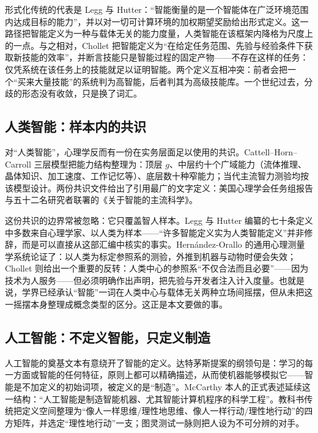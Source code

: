\documentclass[10pt,fontset=fandol]{ctexart}
\begin{document}
形式化传统的代表是 Legg 与 Hutter：“智能衡量的是一个智能体在广泛环境范围内达成目标的能力”\cite{legg2007universal}，并以对一切可计算环境的加权期望奖励给出形式定义。这一路径把智能定义为一种与载体无关的能力度量，人类智能在该框架内降格为尺度上的一点。与之相对，Chollet 把智能定义为“在给定任务范围、先验与经验条件下获取新技能的效率”\cite{chollet2019measure}，并断言技能只是智能过程的固定产物——不存在这样的任务：仅凭系统在该任务上的技能就足以证明智能。两个定义互相冲突：前者会把一个“买来大量技能”的系统判为高智能，后者判其为高级技能库。一个世纪过去，分歧的形态没有收敛，只是换了词汇。

\subsection{人类智能：样本内的共识}

对“人类智能”，心理学反而有一份在实务层面足以使用的共识。Cattell--Horn--Carroll 三层模型把能力结构整理为：顶层 $g$、中层约十个广域能力（流体推理、晶体知识、加工速度、工作记忆等）、底层数十种窄能力\cite{mcgrew2023chc}；当代主流智力测验均按该模型设计。两份共识文件给出了引用最广的文字定义：美国心理学会任务组报告\cite{neisser1996intelligence}与五十二名研究者联署的《关于智能的主流科学》\cite{gottfredson1997mainstream}。

这份共识的边界常被忽略：它只覆盖智人样本。Legg 与 Hutter 编纂的七十条定义中多数来自心理学家、以人类为样本——“许多智能定义实为人类智能定义”并非修辞，而是可以直接从这部汇编中核实的事实\cite{legg2007definitions}。Hern\'andez-Orallo 的通用心理测量学系统论证了：以人类为标定参照系的测验，外推到机器与动物时便会失效\cite{hernandezorallo2017measure}；Chollet 则给出一个重要的反转：人类中心的参照系“不仅合法而且必要”——因为技术为人服务——但必须明确作出声明，把先验与开发者注入计入度量\cite{chollet2019measure}。也就是说，学界已经承认“智能”一词在人类中心与载体无关两种立场间摇摆，但从未把这一摇摆本身整理成概念类型的区分。这正是本文要做的事。

\subsection{人工智能：不定义智能，只定义制造}

人工智能的奠基文本有意绕开了智能的定义。达特茅斯提案的纲领句是：学习的每一方面或智能的任何特征，原则上都可以精确描述，从而使机器能够模拟它\cite{mccarthy1955dartmouth}——智能是不加定义的初始词项，被定义的是“制造”。McCarthy 本人的正式表述延续这一结构：“人工智能是制造智能机器、尤其智能计算机程序的科学工程”\cite{mccarthy2007whatis}。教科书传统把定义空间整理为“像人一样思维/理性地思维、像人一样行动/理性地行动”的四方矩阵，并选定“理性地行动”一支\cite{russell2021aima}；图灵测试一脉则把人设为不可分辨的对手\cite{turing1950computing}。
\end{document}
